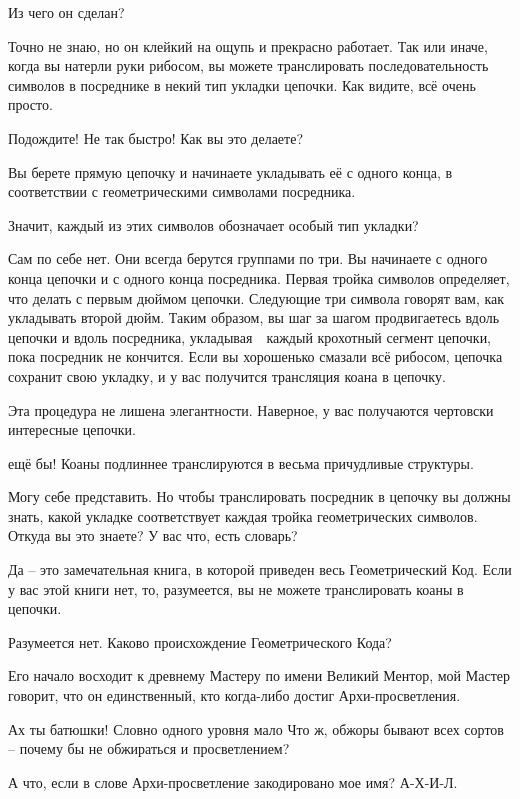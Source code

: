 \documentclass[../main.tex]{subfiles}
\begin{document}
\begin{dialogue}
 Из чего он сделан?

 Точно не знаю, но он клейкий на ощупь и прекрасно работает. Так или иначе, когда вы натерли руки рибосом, вы можете транслировать последовательность символов в посреднике в некий тип укладки цепочки. Как видите, всё очень просто.

 Подождите! Не так быстро! Как вы это делаете?

 Вы берете прямую цепочку и начинаете укладывать её с одного конца, в соответствии с геометрическими символами посредника.

 Значит, каждый из этих символов обозначает особый тип укладки?

 Сам по себе нет. Они всегда берутся группами по три. Вы начинаете с одного конца цепочки и с одного конца посредника. Первая тройка символов определяет, что делать с первым дюймом цепочки. Следующие три символа говорят вам, как укладывать второй дюйм. Таким образом, вы шаг за шагом продвигаетесь вдоль цепочки и вдоль посредника, укладывая~~каждый крохотный сегмент цепочки, пока посредник не кончится. Если вы хорошенько смазали всё рибосом, цепочка сохранит свою укладку, и у вас получится трансляция коана в цепочку.

 Эта процедура не лишена элегантности. Наверное, у вас получаются чертовски интересные цепочки.

 ещё бы! Коаны подлиннее транслируются в весьма причудливые структуры.

 Могу себе представить. Но чтобы транслировать посредник в цепочку вы должны знать, какой укладке соответствует каждая тройка геометрических символов. Откуда вы это знаете? У вас что, есть словарь?

 Да \--- это замечательная книга, в которой приведен весь Геометрический Код. Если у вас этой книги нет, то, разумеется, вы не можете транслировать коаны в цепочки.

 Разумеется нет. Каково происхождение Геометрического Кода?

 Его начало восходит к древнему Мастеру по имени Великий Ментор, мой Мастер говорит, что он единственный, кто когда-либо достиг Архи-просветления.

 Ах ты батюшки! Словно одного уровня мало Что ж, обжоры бывают всех сортов \--- почему бы не обжираться и просветлением?

 А что, если в слове Архи-просветление закодировано мое имя? \mbox{А-Х-И-Л}.


\end{dialogue}
\end{document}
